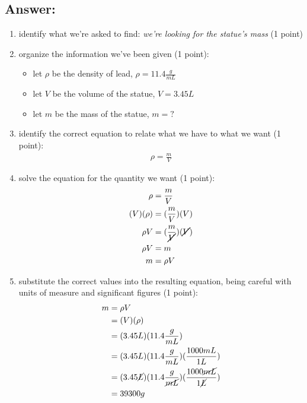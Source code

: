 \documentclass[11pt, oneside]{article}   	%
\begin{document}
\subsection*{Answer:}
\begin{enumerate}
\item identify what we're asked to find: \emph{we're looking for the statue's mass} (1 point)
\item organize the information we've been given (1 point):
\begin{itemize}
\item let $\rho$ be the density of lead, $\rho = 11.4 \frac{g}{mL}$
\item let $V$ be the volume of the statue, $V = 3.45 L$
\item let $m$ be the mass of the statue, $m = ?$
\end{itemize}
\item identify the correct equation to relate what we have to what we want (1 point):
\begin{equation} 
\begin{split}
       \rho = \frac{m}{V}
 \end{split}
 \end{equation}
 
 \item solve the equation for the quantity we want (1 point):
 \begin{equation} 
\begin{split}
       \rho        &= \frac{m}{V} \\
       (V)(\rho) &=  (\frac{m}{V})(V) \\
       \rho V     &=  (\frac{m}{\cancel{V}})(\cancel{V}) \\
       \rho V     &=  m \\
       m            &= \rho V
 \end{split}
 \end{equation}
 
 \item substitute the correct values into the resulting equation, being careful with units of measure and significant figures (1 point):
\begin{equation} 
\begin{split}
       m            &= \rho V \\
                      &= (V)(\rho) \\
                      &= (3.45 L)(11.4 \frac{g}{mL}) \\
                      &= (3.45 L)(11.4 \frac{g}{mL})(\frac{1000 mL}{1 L}) \\
                      &= (3.45 \cancel{L})(11.4 \frac{g}{\cancel{mL}})(\frac{1000 \cancel{mL}}{1 \cancel{L}}) \\
                      &= 39300 g 
 \end{split}
 \end{equation}
 \end{enumerate}
\end{document}
